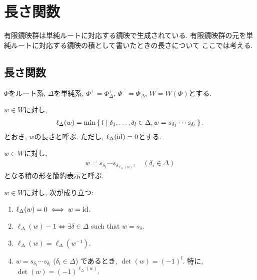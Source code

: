 \chapter{長さ関数}

有限鏡映群は単純ルートに対応する鏡映で生成されている.
有限鏡映群の元を単純ルートに対応する鏡映の積として書いたときの長さについて
ここでは考える.

\section{長さ関数}
$\Phi$をルート系, $\Delta$を単純系,
$\Phi^+=\Phi_\Delta^+$,
$\Phi^-=\Phi_\Delta^-$, $W=W(\Phi)$とする.

\begin{definition}
  $w\in W$に対し,
  \begin{align*}
    \ell_\Delta(w)=\min\Set{l|\delta_1,\ldots,\delta_l\in \Delta, w=s_{\delta_1}\cdots s_{\delta_l}}.
  \end{align*}
  とおき, $w$の長さと呼ぶ.
  ただし, $\ell_\Delta(\operatorname{id})=0$とする.
\end{definition}
\begin{definition}
  $w\in W$に対し,
  \begin{align*}
    w=s_{\delta_1}\cdots s_{\delta_{\ell_\Delta(w)}},\quad (\delta_i\in \Delta)
  \end{align*}
  となる積の形を簡約表示と呼ぶ.  
\end{definition}
\begin{prop}
  $w\in W$に対し, 次が成り立つ:
  \begin{enumerate}
  \item
    \label{item:len:nilisid}
    $\ell_\Delta(w)=0 \iff w=\operatorname{id}$.
  \item
    \label{item:len:1issimple}
    $\ell_\Delta(w)-1 \iff \exists \delta\in\Delta$ such that $w=s_\delta$.
  \item
    \label{item:len:inversestable}
    $\ell_\Delta(w)=\ell_\Delta(w^{-1})$.
  \item
    \label{item:len:det}
    $w=s_{\delta_1}\cdots s_{\delta_l}$ ($\delta_i\in\Delta$)
    であるとき, $\det(w)=(-1)^l$.
    特に,
    $\det(w)=(-1)^{\ell_\Delta(w)}$.
  \end{enumerate}
\end{prop}

